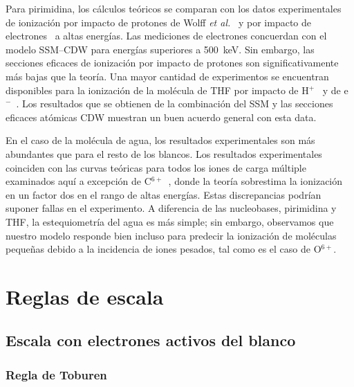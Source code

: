 Para pirimidina, los cálculos teóricos se comparan con los datos 
experimentales de ionización por impacto de protones de Wolff 
\textit{et al.}~\cite{wolff2014} y por impacto de 
electrones~\cite{bug2017} a altas energías. Las mediciones de electrones 
concuerdan con el modelo SSM--CDW para energías superiores a 500~keV. 
Sin embargo, las secciones eficaces de ionización por impacto de 
protones son significativamente más bajas que la teoría. Una mayor 
cantidad de experimentos se encuentran disponibles para la ionización de 
la molécula de THF por impacto de H$^+$~\cite{wang2016} y de 
e$^-$~\cite{bug2017,wolf2019,fuss2009}. Los resultados que se obtienen 
de la combinación del SSM y las secciones eficaces atómicas CDW muestran 
un buen acuerdo general con esta data.

En el caso de la molécula de agua, los resultados experimentales son más 
abundantes que para el resto de los blancos. Los resultados 
experimentales~\cite{Luna2007,Bolorizadeh86,H_Rudd85,Ohsawa05,He_Rudd85,
toburen80,Bhattacharjee:16} coinciden con las curvas teóricas para 
todos los iones de carga múltiple examinados aquí a excepción de
C$^{6+}$~\cite{DalCappello:09,Bhattacharjee:17}, donde la teoría 
sobrestima la ionización en un factor dos en el rango de altas energías. 
Estas discrepancias podrían suponer fallas en el experimento. 
A diferencia de las nucleobases, pirimidina y THF, la estequiometría del 
agua es más simple; sin embargo, observamos que nuestro modelo responde 
bien incluso para predecir la ionización de moléculas pequeñas debido a 
la incidencia de iones pesados, tal como es el caso de O$^{6+}$.

\section{Reglas de escala}
\label{sec:scaling}

\subsection{Escala con electrones activos del blanco}
\label{subsec:ne_scaling}

\subsubsection*{Regla de Toburen}
\label{subsec:toburen}

